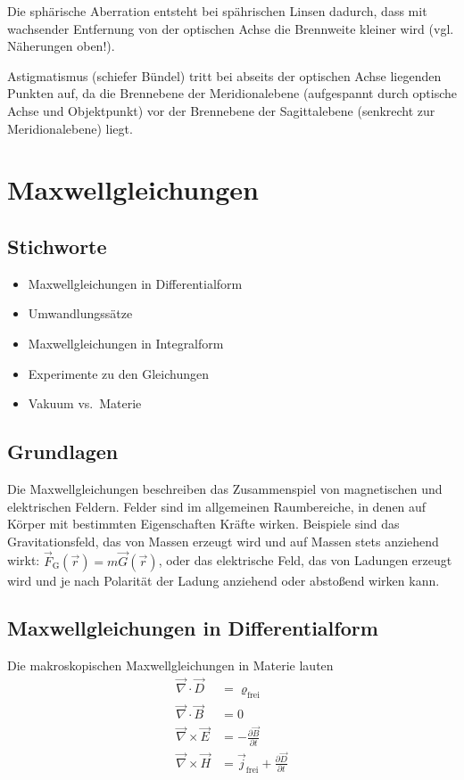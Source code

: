 \documentclass[a4paper]{scrartcl}
\begin{document}
Die sphärische Aberration entsteht bei spährischen Linsen dadurch, dass mit wachsender Entfernung von der optischen Achse die Brennweite kleiner wird (vgl. Näherungen oben!).

Astigmatismus (schiefer Bündel) tritt bei abseits der optischen Achse liegenden Punkten auf, da die Brennebene der Meridionalebene (aufgespannt durch optische Achse und Objektpunkt) vor der Brennebene der Sagittalebene (senkrecht zur Meridionalebene) liegt.


\section{Maxwellgleichungen}
\subsection{Stichworte}
\begin{itemize}[noitemsep]
  \item Maxwellgleichungen in Differentialform
  \item Umwandlungssätze
  \item Maxwellgleichungen in Integralform
  \item Experimente zu den Gleichungen
  \item Vakuum vs.\ Materie
\end{itemize}

\subsection{Grundlagen}
Die Maxwellgleichungen beschreiben das Zusammenspiel von magnetischen und elektrischen Feldern. Felder sind im allgemeinen Raumbereiche, in denen auf Körper mit bestimmten Eigenschaften Kräfte wirken. Beispiele sind das Gravitationsfeld, das von Massen erzeugt wird und auf Massen stets anziehend wirkt: $\vec F_\text{G}(\vec r) = m \vec G(\vec r)$, oder das elektrische Feld, das von Ladungen erzeugt wird und je nach Polarität der Ladung anziehend oder abstoßend wirken kann.

\subsection{Maxwellgleichungen in Differentialform}
Die makroskopischen Maxwellgleichungen in Materie lauten
\begin{align}
  \label{equ:MaxDiff1}  \vec \nabla \cdot \vec D &= \varrho_\text{frei} \tag{M1d}\\
  \label{equ:MaxDiff2}  \vec \nabla \cdot \vec B &= 0 \tag{M2d}\\
  \label{equ:MaxDiff3}  \vec \nabla \times \vec E &= -\frac{\partial \vec B}{\partial t} \tag{M3d}\\
  \label{equ:MaxDiff4}  \vec \nabla \times \vec H &= \vec j_\text{frei} + \frac{\partial \vec D}{\partial t} \tag{M4d}
\end{align}
\end{document}
